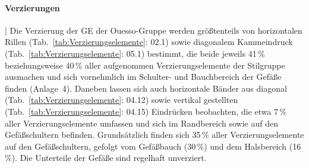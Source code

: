 \paragraph{Verzierungen}\hspace{-.5em}|\hspace{.5em}%
Die Verzierung der GE der Ouesso-Gruppe werden größtenteils von horizontalen Rillen (Tab.~\ref{tab:Verzierungselemente}: 02.1) sowie diagonalem Kammeindruck (Tab.~\ref{tab:Verzierungselemente}: 05.1) bestimmt, die beide jeweils 41\,\% beziehungsweise 40\,\% aller aufgenommen Verzierungselemente der Stilgruppe ausmachen und sich vornehmlich im Schulter- und Bauchbereich der Gefäße finden (Anlage~4). Daneben lassen sich auch horizontale Bänder aus diagonal (Tab.~\ref{tab:Verzierungselemente}: 04.12) sowie vertikal gestellten (Tab.~\ref{tab:Verzierungselemente}: 04.15) Eindrücken beobachten, die etwa 7\,\% aller Verzierungselemente umfassen und sich im Randbereich sowie auf den Gefäßschultern befinden. Grundsätzlich finden sich 35\,\% aller Verzierungselemente auf den Gefäßschultern, gefolgt vom Gefäßbauch (30\,\%) und dem Halsbereich (16\,\%). Die Unterteile der Gefäße sind regelhaft unverziert.


